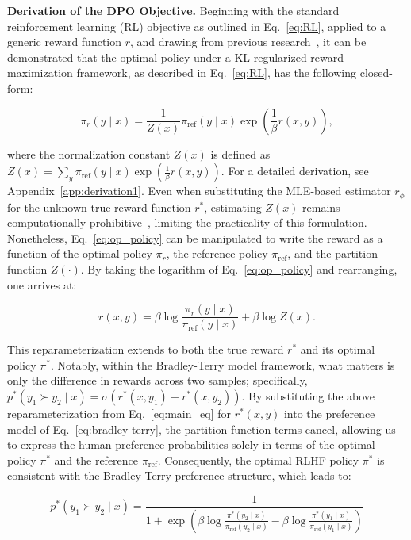 \textbf{Derivation of the DPO Objective.} Beginning with the standard reinforcement learning (RL) objective as outlined in Eq.~\ref{eq:RL}, applied to a generic reward function $r$, and drawing from previous research~\citep{peters2007reinforcement, peng2019advantage, korbak2022reinforcement, go2023aligning}, it can be demonstrated that the optimal policy under a KL-regularized reward maximization framework, as described in Eq.~\ref{eq:RL}, has the following closed-form:

\begin{equation}\label{eq:op_policy}
    \pi_r(y\mid x) = \frac{1}{Z(x)}\pi_\text{ref}(y\mid x)\exp\left(\frac{1}{\beta}r(x, y)\right),
\end{equation}

where the normalization constant $Z(x)$ is defined as $Z(x) =\sum_{y}\pi_\text{ref}(y\mid x)\exp\left(\frac{1}{\beta}r(x, y)\right)$. For a detailed derivation, see Appendix~\ref{app:derivation1}. Even when substituting the MLE-based estimator $r_{\phi}$ for the unknown true reward function $r^*$, estimating $Z(x)$ remains computationally prohibitive~\citep{korbak2022reinforcement, go2023aligning}, limiting the practicality of this formulation. Nonetheless, Eq.~\ref{eq:op_policy} can be manipulated to write the reward as a function of the optimal policy $\pi_r$, the reference policy $\pi_\text{ref}$, and the partition function $Z(\cdot)$. By taking the logarithm of Eq.~\ref{eq:op_policy} and rearranging, one arrives at:

\begin{equation}\label{eq:main_eq}
    r(x,y) =\beta \log \frac{\pi_r(y\mid x)}{\pi_\text{ref}(y\mid x)} + \beta \log Z(x).
\end{equation}

This reparameterization extends to both the true reward $r^*$ and its optimal policy $\pi^*$. Notably, within the Bradley-Terry model framework, what matters is only the difference in rewards across two samples; specifically, ${p^*(y_1 \succ y_2 \mid x) = \sigma(r^*(x, y_1) - r^*(x, y_2))}$. By substituting the above reparameterization from Eq.~\ref{eq:main_eq} for $r^*(x, y)$ into the preference model of Eq.~\ref{eq:bradley-terry}, the partition function terms cancel, allowing us to express the human preference probabilities solely in terms of the optimal policy $\pi^*$ and the reference $\pi_\text{ref}$. Consequently, the optimal RLHF policy $\pi^*$ is consistent with the Bradley-Terry preference structure, which leads to:

\begin{equation}\label{eq:objective}
    p^*(y_1\succ y_2 \mid x)=\frac{1}{1 + \exp\left(\beta \log \frac{\pi^*(y_2\mid x)}{\pi_\text{ref}(y_2\mid x)} - \beta \log \frac{\pi^*(y_1\mid x)}{\pi_\text{ref}(y_1\mid x)}\right)}
\end{equation}

